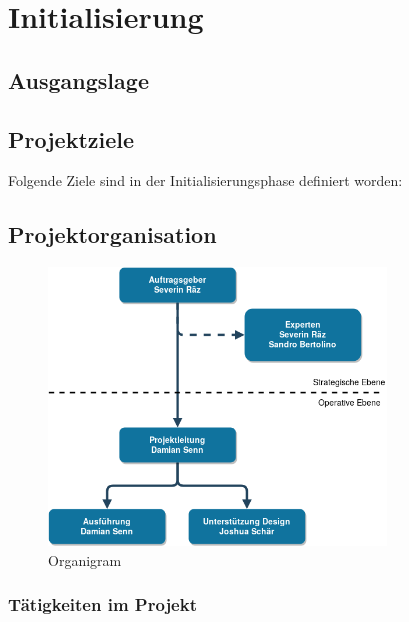 \chapter{Initialisierung}

\label{ReportInitialisierung}

\section{Ausgangslage}



\clearpage
\section{Projektziele}

Folgende Ziele sind in der Initialisierungsphase definiert worden:



\clearpage

\section{Projektorganisation}

\begin{figure}[!htb]
  \centering
  \includegraphics[width=0.8\textwidth]{figures/organigram.png}
  \caption{Organigram}
\end{figure}

\subsection{Tätigkeiten im Projekt}\label{tuxe4tigkeiten-im-projekt}


